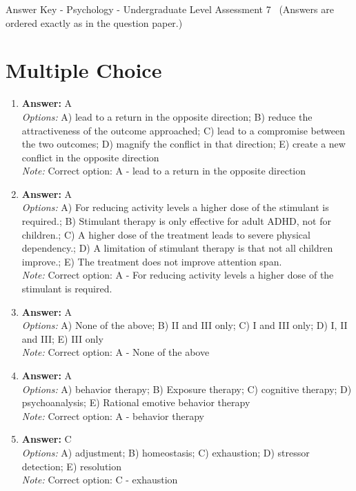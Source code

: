 \documentclass[12pt]{article}
\begin{document}
\begin{center}
Answer Key - Psychology - Undergraduate Level Assessment 7 \
\small (Answers are ordered exactly as in the question paper.)
\end{center}

\section*{Multiple Choice}
\begin{enumerate}[label=\arabic*.]
\item \textbf{Answer:} A
\\ \textit{Options:} A) lead to a return in the opposite direction; B) reduce the attractiveness of the outcome approached; C) lead to a compromise between the two outcomes; D) magnify the conflict in that direction; E) create a new conflict in the opposite direction
\\ \textit{Note:} Correct option: A - lead to a return in the opposite direction
\item \textbf{Answer:} A
\\ \textit{Options:} A) For reducing activity levels a higher dose of the stimulant is required.; B) Stimulant therapy is only effective for adult ADHD, not for children.; C) A higher dose of the treatment leads to severe physical dependency.; D) A limitation of stimulant therapy is that not all children improve.; E) The treatment does not improve attention span.
\\ \textit{Note:} Correct option: A - For reducing activity levels a higher dose of the stimulant is required.
\item \textbf{Answer:} A
\\ \textit{Options:} A) None of the above; B) II and III only; C) I and III only; D) I, II and III; E) III only
\\ \textit{Note:} Correct option: A - None of the above
\item \textbf{Answer:} A
\\ \textit{Options:} A) behavior therapy; B) Exposure therapy; C) cognitive therapy; D) psychoanalysis; E) Rational emotive behavior therapy
\\ \textit{Note:} Correct option: A - behavior therapy
\item \textbf{Answer:} C
\\ \textit{Options:} A) adjustment; B) homeostasis; C) exhaustion; D) stressor detection; E) resolution
\\ \textit{Note:} Correct option: C - exhaustion
\end{enumerate}
\end{document}
